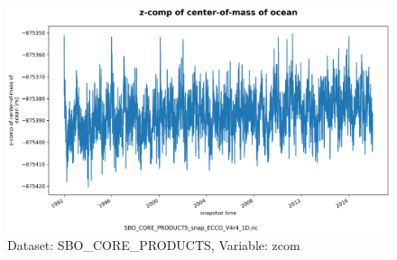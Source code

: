 \begin{figure}[H]
\centering
\includegraphics[scale=0.55]{../images/plots/oneD_plots/SBO_Core_Products/zcom.png}
\caption{Dataset: SBO\_CORE\_PRODUCTS, Variable: zcom}
\label{tab:table-SBO_CORE_PRODUCTS_zcom-Plot}
\end{figure}
\newpage
\pagebreak
